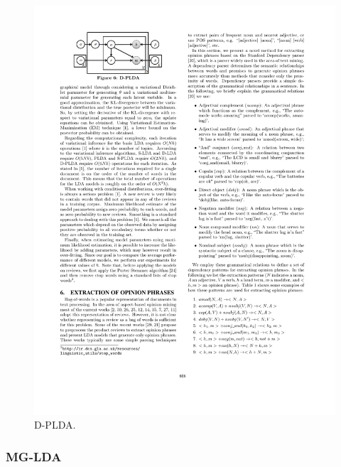 \begin{figure}
\centering
\includegraphics[width=0.5\columnwidth]{figures/methods/D-PLDA}
\caption{D-PLDA. \cite{moghaddam2012design}}
\label{fig:methods:D-PLDA}
\end{figure}

\subsubsection{MG-LDA}

